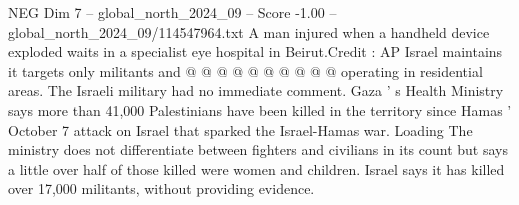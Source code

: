 \begin{textsample}{NEG Dim 7 – global\_north\_2024\_09 – Score -1.00 – global\_north\_2024\_09/114547964.txt}
A man injured when a handheld device exploded waits in a specialist eye hospital in Beirut.Credit : AP Israel maintains it targets only militants and @ @ @ @ @ @ @ @ @ @ operating in residential areas.
The Israeli military had no immediate comment.
Gaza ' s Health Ministry says more than 41,000 Palestinians have been killed in the territory since Hamas ' October 7 attack on Israel that sparked the Israel-Hamas war.
Loading The ministry does not differentiate between fighters and civilians in its count but says a little over half of those killed were women and children.
Israel says it has killed over 17,000 militants, without providing evidence.

\end{textsample}
